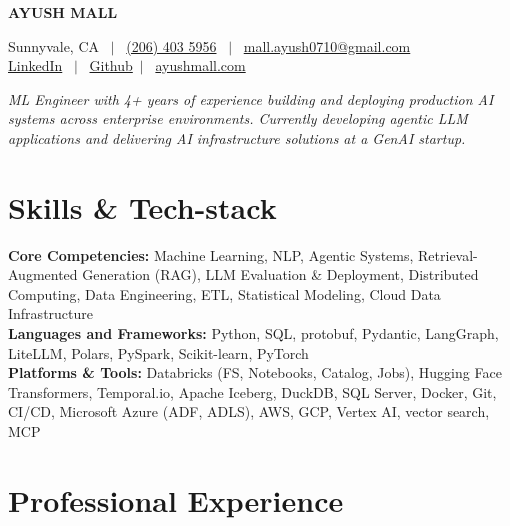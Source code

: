 \documentclass[10pt,a4paper]{article}
\begin{document}

\noindent
\begin{minipage}[c]{0.45\textwidth}
    \vspace{0pt}
    {\LARGE \textbf{AYUSH MALL}}
\end{minipage}%
\begin{minipage}[c]{0.55\textwidth}
    \raggedleft
    Sunnyvale, CA \ $|$ \ \href{tel:12064035956}{(206) 403 5956} \ $|$ \
    \href{mailto:mall.ayush0710@gmail.com?subject=Resume\%20Enquiry}{mall.ayush0710@gmail.com} \\
    \href{https://www.linkedin.com/in/ayush-mall}{LinkedIn} \ $|$ \
    \href{https://github.com/ayushmall0710}{Github}\ $|$ \
    \href{https://ayushmall.com}{ayushmall.com} \\
\end{minipage}

\vspace{0.2em}

\noindent\textit{ML Engineer with 4+ years of experience building and deploying production AI systems across enterprise environments. Currently developing agentic LLM applications and delivering AI infrastructure solutions at a GenAI startup.}

\section*{Skills \& Tech-stack}

\textbf{Core Competencies:} Machine Learning, NLP, Agentic Systems, Retrieval-Augmented Generation (RAG), LLM Evaluation \& Deployment, Distributed Computing, Data Engineering, ETL, Statistical Modeling, Cloud Data Infrastructure \\
\textbf{Languages and Frameworks:} Python, SQL, protobuf, Pydantic, LangGraph, LiteLLM, Polars, PySpark, Scikit-learn, PyTorch \\
\textbf{Platforms \& Tools:} Databricks (FS, Notebooks, Catalog, Jobs), Hugging Face Transformers, Temporal.io, Apache Iceberg, DuckDB, SQL Server, Docker, Git, CI/CD, Microsoft Azure (ADF, ADLS), AWS, GCP, Vertex AI, vector search, MCP

\section*{Professional Experience}
\end{document}
